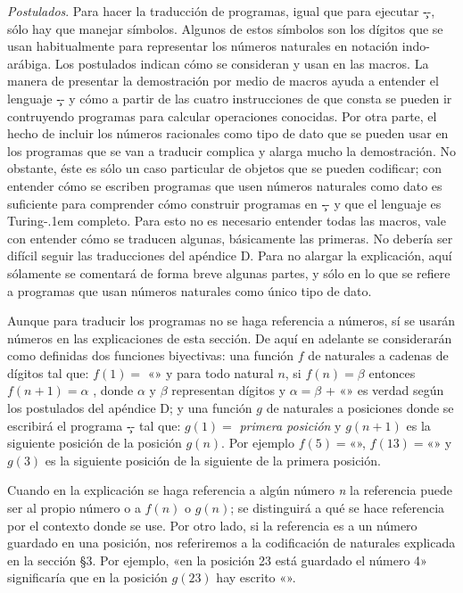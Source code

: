 {\it Postulados}. Para hacer la traducción de programas, igual que para ejecutar \c--, sólo hay que
manejar símbolos. Algunos de estos símbolos son los dígitos que se usan habitualmente para
representar los números naturales en notación indo-arábiga. Los postulados indican cómo se consideran
y usan en las macros.
\finlista
{}
La manera de presentar la demostración por medio de macros ayuda a entender el lenguaje \c-- y cómo
a partir de las cuatro instrucciones de que consta se pueden ir contruyendo programas para calcular
operaciones conocidas. Por otra parte, el hecho de incluir los números racionales como tipo de dato
que se pueden usar en los programas que se van a traducir complica y alarga mucho la
demostración. No obstante, éste es sólo un caso particular de objetos que se pueden codificar; con
entender cómo se escriben programas que usen números naturales como dato es suficiente para
comprender cómo construir programas en \c-- y que el lenguaje es Turing-\kern.1em completo. Para
esto no es necesario entender todas las macros, vale con entender cómo se traducen algunas,
básicamente las primeras. No debería ser difícil seguir las traducciones del apéndice D. Para no
alargar la explicación, aquí sólamente se comentará de forma breve algunas partes, y sólo en lo que
se refiere a programas que usan números naturales como único tipo de dato.

Aunque para traducir los programas no se haga referencia a números, sí se usarán números en las
explicaciones de esta sección. De aquí en adelante se considerarán como definidas dos funciones biyectivas: una
función $ f $ de naturales a cadenas de dígitos tal que: $ f(1)= $ «» y para todo natural
$ n $, si $ f(n)=\beta $ entonces $ f(n+1)=\alpha $ , donde $ \alpha $ y $ \beta $ representan
dígitos y $ \alpha = \beta $ + «» es verdad según los postulados del apéndice D; y una
función $ g $ de naturales a posiciones donde se escribirá el programa \c-- tal que: $ g(1)= $ {\it
primera posición} y $ g(n+1)$ es la siguiente posición de la posición $ g(n)$. Por ejemplo $ f(5)=
$«{}», $ f(13)=$«{}» y $g(3)$ es la siguiente posición de la siguiente de la primera
posición.

Cuando en la explicación se haga referencia a algún número {\it n} la referencia puede ser al propio
número o a $f(n)$ o $g(n)$; se distinguirá a qué se hace referencia por el contexto donde se
use. Por otro lado, si la referencia es a un número guardado en una posición, nos referiremos a la
codificación de naturales explicada en la sección §3. Por ejemplo, «en la posición 23 está
guardado el número 4» significaría que en la posición $g(23)$ hay escrito «».

